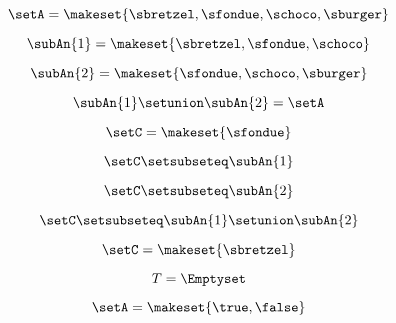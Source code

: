 {\begin{forslides}
        \begin{equation}
            \label{eq:feedback-071}
            \setA = \makeset{ \sbretzel, \sfondue, \schoco, \sburger }
        \end{equation}

        \begin{equation}
            \label{eq:feedback-071b}
            \subAn{1} = \makeset{ \sbretzel, \sfondue, \schoco }
        \end{equation}

        \begin{equation}
            \label{eq:feedback-072}
            \subAn{2} = \makeset{\sfondue, \schoco, \sburger }
        \end{equation}

        \begin{equation}
            \label{eq:feedback-073}
            \subAn{1} \setunion \subAn{2} = \setA
        \end{equation}

        \begin{equation}
            \label{eq:feedback-074}
            \setC = \makeset{ \sfondue }
        \end{equation}

        \begin{equation}
            \label{eq:feedback-075}
            \setC \setsubseteq \subAn{1}
        \end{equation}

        \begin{equation}
            \label{eq:feedback-076}
            \setC \setsubseteq \subAn{2}
        \end{equation}

        \begin{equation}
            \label{eq:feedback-077}
            \setC \setsubseteq \subAn{1} \setunion \subAn{2}
        \end{equation}

        \begin{equation}
            \label{eq:feedback-078}
            \setC = \makeset{ \sbretzel }
        \end{equation}

        \begin{equation}
            \label{eq:feedback-079}
            T = \Emptyset
        \end{equation}

        \begin{equation}
            \label{eq:feedback-080}
            \setA = \makeset{ \true, \false }
        \end{equation}


\end{forslides}}
